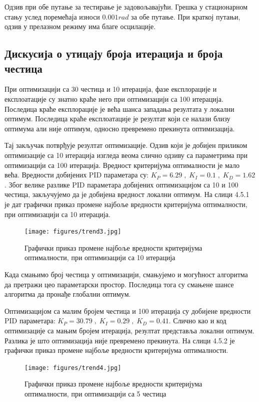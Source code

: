 \documentclass[12pt]{article}
\begin{document}
Одзив при обе путање за тестирање је задовољавајући. Грешка у стационарном стању услед поремећаја износи $0.001rad$ за обе путање. При краткој путањи, одзив у прелазном режиму има благе осцилације.


\subsection{Дискусија о утицају броја итерација и броја честица}
При оптимизацији са 30 честица и 10 итерација, фазе експлорације и експлоатације су знатно краће него при оптимизацији са 100 итерација. Последица краће експлорације је већа шанса западања резултата у локални оптимум. Последица краће експлоатације је резултат који се налази близу оптимума али није оптимум, односно превремено прекинута оптимизација.

Тај закључак потврђује резултат оптимизације. Одзив који је добијен приликом оптимизације са 10 итерација изгледа веома слично одзиву са параметрима при оптимизацији са 100 итерација. Вредност критеријума оптималности је мало већа. Вредности добијених PID параметара су: $K_P=6.29\;,\;K_I=0.1\;,\;K_D=1.62$. Због велике разлике PID параметара добијених оптимизацијом са 10 и 100 честица, закључујемо да је добијена вредност локални оптимум. На слици 4.5.1 је дат графички приказ промене најбоље вредности критеријума оптималности, при оптимизацији са 10 итерација.

\begin{figure}[H]
    \centering
    \texttt{[image: figures/trend3.jpg]}
    \caption{Графички приказ промене најбоље вредности критеријума оптималности, при оптимизацији са 10 итерација}
    \label{fig:trend_3}
\end{figure}

Када смањимо број честица у оптимизацији, смањујемо и могућност алгоритма да претражи цео параметарски простор. Последица тога су смањене шансе алгоритма да пронађе глобални оптимум.

Оптимизацијом са малим бројем честица и 100 итерација су добијене вредности PID параметара: $K_P=30.79\;,\;K_I=0.29\;,\;K_D=0.41$. Слично као и код оптимизације са мањим бројем итерација, резултат представља локални оптимум. Разлика је што оптимизација није превремено прекинута. На слици 4.5.2 је графички приказ промене најбоље вредности критеријума оптималности.

\begin{figure}[H]
    \centering
    \texttt{[image: figures/trend4.jpg]}
    \caption{Графички приказ промене најбоље вредности критеријума оптималности, при оптимизацији са 5 честица}
    \label{fig:trend_4}
\end{figure}
\newpage
\end{document}
